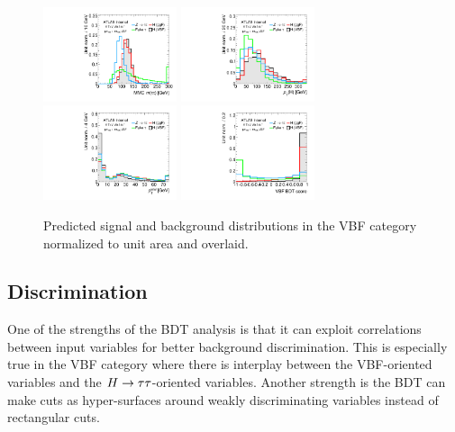 \begin{figure}[tp]
  \centering
  \includegraphics[width=0.35\textwidth]{figures/overlaid/vbf/mMMC}
  \includegraphics[width=0.35\textwidth]{figures/overlaid/vbf/H-pt-hi}
  \includegraphics[width=0.35\textwidth]{figures/overlaid/vbf/system-pt}
  \includegraphics[width=0.35\textwidth]{figures/overlaid/vbf/BDTEve-VBF}
  \caption{Predicted signal and background distributions in the VBF category normalized to unit area and overlaid.}
  \label{fig:strategy-overlaid-vbf-3}
\end{figure}
\clearpage

\subsection{Discrimination}
\label{sec:strategy-mva-correlations}

One of the strengths of the BDT analysis is that it can exploit correlations between input variables for better background discrimination. This is especially true in the VBF category where there is interplay between the VBF-oriented variables and the $H\rightarrow\tau\tau$-oriented variables. Another strength is the BDT can make cuts as hyper-surfaces around weakly discriminating variables instead of rectangular cuts.


